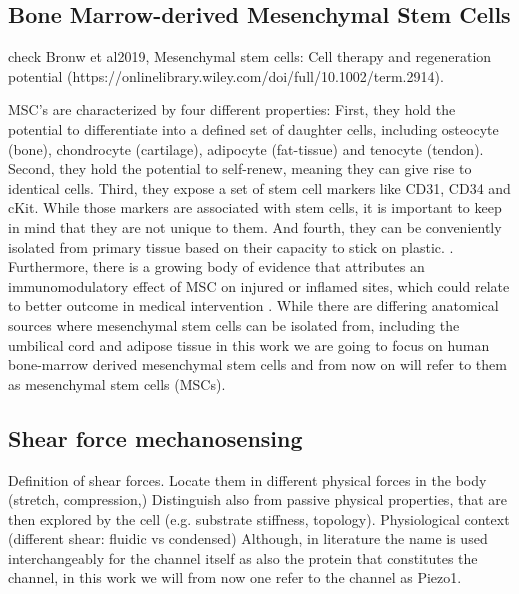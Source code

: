 \subsection{Bone Marrow-derived Mesenchymal Stem Cells}

check Bronw et al2019, Mesenchymal stem cells: Cell therapy and regeneration potential (https://onlinelibrary.wiley.com/doi/full/10.1002/term.2914). 

MSC's are characterized by four different properties: First, they hold the potential to differentiate into a defined set of daughter cells, including osteocyte (bone), chondrocyte (cartilage), adipocyte (fat-tissue) and tenocyte (tendon).\cite{Ng2008} Second, they hold the potential to self-renew, meaning they can give rise to identical cells. Third, they expose a set of stem cell markers like CD31, CD34 and cKit. While those markers are associated with stem cells, it is important to keep in mind that they are not unique to them. \cite{Battula2009} And fourth, they can be conveniently isolated from primary tissue based on their capacity to stick on plastic. \cite{Buhring2007}. Furthermore, there is a growing body of evidence that attributes an immunomodulatory effect of MSC on injured or inflamed sites, which could relate to better outcome in medical intervention \cite{Hass2011, Caplan2011}.
While there are differing anatomical sources where mesenchymal stem cells can be isolated from, including the umbilical cord and adipose tissue \cite{Barlow2008, Hass2011} in this work we are going to focus on human bone-marrow derived mesenchymal stem cells and from now on will refer to them as mesenchymal stem cells (MSCs).

\subsection{Shear force mechanosensing}
Definition of shear forces. Locate them in different physical forces in the body (stretch, compression,) Distinguish also from passive physical properties, that are then explored by the cell (e.g. substrate stiffness, topology).
Physiological context (different shear: fluidic vs condensed)
Although, in literature the name \Piezo{} is used interchangeably for the channel itself as also the protein that constitutes the channel, in this work we will from now one refer to the channel as Piezo1.

